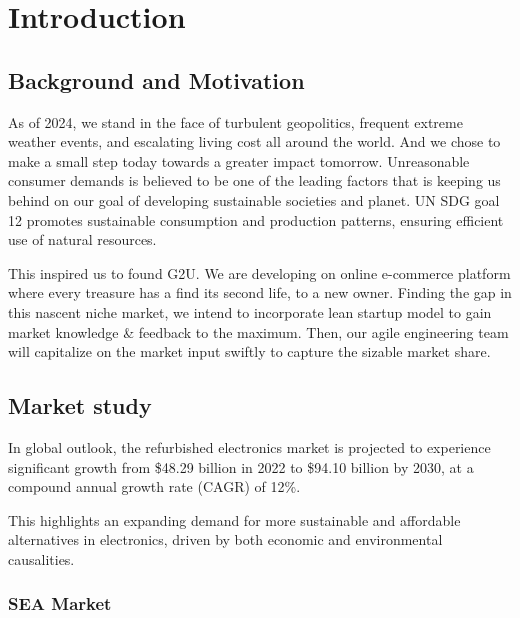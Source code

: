 %
%
\chapter{Introduction}

\section{Background and Motivation}

As of 2024, we stand in the face of turbulent geopolitics, frequent extreme weather events, and escalating living cost all around the world. And we chose to make a small step today towards a greater impact tomorrow. Unreasonable consumer demands is believed to be one of the leading factors that is keeping us behind on our goal of developing sustainable societies and planet. UN SDG goal 12 promotes sustainable consumption and production patterns, ensuring efficient use of natural resources.

This inspired us to found G2U. We are developing on online e-commerce platform where every treasure has a find its second life, to a new owner. Finding the gap in this nascent niche market, we intend to incorporate lean startup model to gain market knowledge \& feedback to the maximum. Then, our agile engineering team will capitalize on the market input swiftly to capture the sizable market share.



\section{Market study}


In global outlook,  the refurbished electronics market is projected to experience significant growth from \$48.29 billion in 2022 to \$94.10 billion by 2030, at a compound annual growth rate (CAGR) of 12\%. 

This highlights an expanding demand for more sustainable and affordable alternatives in electronics, driven by both economic and environmental causalities.

\subsection{SEA Market}

